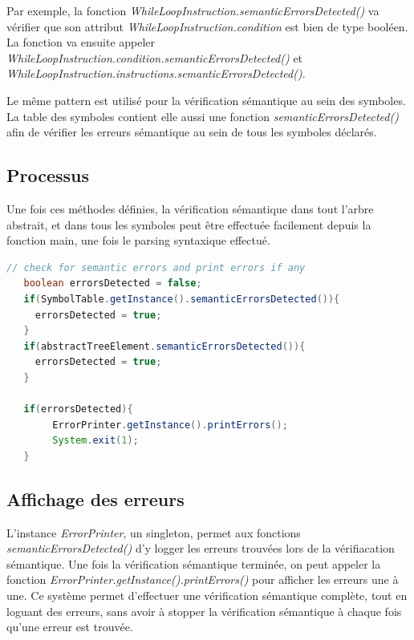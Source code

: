 \documentclass[11pt,a4paper]{article}
\begin{document}
  \par Par exemple, la fonction \textit{WhileLoopInstruction.semanticErrorsDetected()} va vérifier que son attribut \textit{WhileLoopInstruction.condition} est bien de type booléen. La fonction va ensuite appeler \textit{WhileLoopInstruction.condition.semanticErrorsDetected()} et \\ \textit{WhileLoopInstruction.instructions.semanticErrorsDetected()}. 
  
  \par Le même pattern est utilisé pour la vérification sémantique au sein des symboles. La table des symboles contient elle aussi une fonction \textit{semanticErrorsDetected()} afin de vérifier les erreurs sémantique au sein de tous les symboles déclarés. 
  
  \subsection{Processus}
  
  \par Une fois ces méthodes définies, la vérification sémantique dans tout l'arbre abstrait, et dans tous les symboles peut être effectuée facilement depuis la fonction main, une fois le parsing syntaxique effectué. 
  
    \begin{lstlisting}[language=java,caption={Processus de vérification syntaxique}]
   // check for semantic errors and print errors if any
   boolean errorsDetected = false;
   if(SymbolTable.getInstance().semanticErrorsDetected()){
     errorsDetected = true;
   }
   if(abstractTreeElement.semanticErrorsDetected()){
     errorsDetected = true;
   }

   if(errorsDetected){
     	ErrorPrinter.getInstance().printErrors();
      	System.exit(1);
   }
   \end{lstlisting}
   
  \newpage
  \subsection{Affichage des erreurs}
  
  \par L'instance \textit{ErrorPrinter}, un singleton, permet aux fonctions \textit{semanticErrorsDetected()} d'y logger les erreurs trouvées lors de la vérifiacation sémantique. Une fois la vérification sémantique terminée, on peut appeler la fonction \textit{ErrorPrinter.getInstance().printErrors()} pour afficher les erreurs une à une. Ce système permet d'effectuer une vérification sémantique complète, tout en loguant des erreurs, sans avoir à stopper la vérification sémantique à chaque fois qu'une erreur est trouvée. 
  
\end{document}

